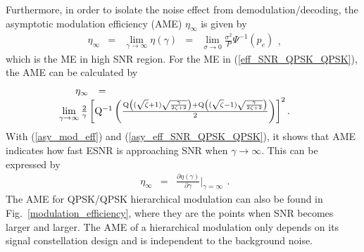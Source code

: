 \documentclass[conference]{IEEEtran}
\begin{document}
Furthermore, in order to isolate the noise effect from
demodulation/decoding, the asymptotic modulation efficiency (AME)
$\eta_{\infty}$ is given by
\begin{equation}
\begin{array}{rcccl}
\eta_{\infty}&=&\lim\limits_{\gamma\rightarrow\infty}\eta\left(\gamma\right)&=&\lim\limits_{\sigma\rightarrow0}\frac{\sigma^2}{P}\Psi^{-1}\left(p_{e}\right)
\end{array},\label{asy_mod_eff}
\end{equation}
\noindent which is the ME in high SNR region. For the ME in
(\ref{eff_SNR_QPSK_QPSK}), the AME can be calculated by
\begin{equation}%
\begin{array}{rcl}
\eta_{\infty}&=&\\
&&\hspace{-0.80in}\lim\limits_{\gamma\rightarrow\infty}\frac{2}{\gamma}\left[{\rm
Q}^{-1}\left(\frac{{\rm
Q}\left((\sqrt{\zeta}+1)\sqrt{\frac{\gamma}{2\zeta+2}}\right)+{\rm
Q}\left((\sqrt{\zeta}-1)\sqrt{\frac{\gamma}{2\zeta+2}}\right)}{2}\right)\right]^2.
\end{array}\label{asy_eff_SNR_QPSK_QPSK}
\end{equation}
\noindent With (\ref{asy_mod_eff}) and
(\ref{asy_eff_SNR_QPSK_QPSK}), it shows that AME indicates how
fast ESNR is approaching SNR when $\gamma\rightarrow\infty$. This
can be expressed by
\begin{equation}
\begin{array}{rcl}
\eta_{\infty}&=&\frac{\partial\eta\left(\gamma\right)}{\partial\gamma}|_{\gamma=\infty}
\end{array}.\label{asy_mod_eff2}
\end{equation}
\noindent The AME for QPSK/QPSK hierarchical modulation can also
be found in Fig.~\ref{modulation_efficiency}, where they are the
points when SNR becomes larger and larger. The AME of a
hierarchical modulation only depends on its signal constellation
design and is independent to the background noise.
\end{document}
